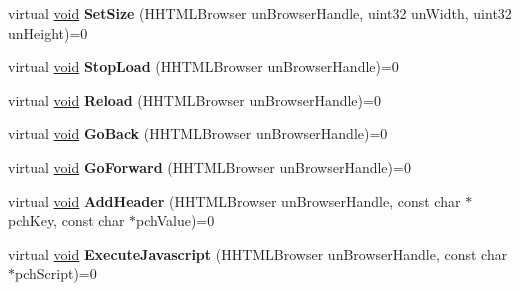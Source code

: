 \begin{DoxyCompactItemize}
\item 
\hypertarget{classISteamHTMLSurface_a740f1a05a2774324954a5b31f204cdca}{}virtual \hyperlink{SDL__audio_8h_a52835ae37c4bb905b903cbaf5d04b05f}{void} {\bfseries Set\+Size} (H\+H\+T\+M\+L\+Browser un\+Browser\+Handle, uint32 un\+Width, uint32 un\+Height)=0\label{classISteamHTMLSurface_a740f1a05a2774324954a5b31f204cdca}

\item 
\hypertarget{classISteamHTMLSurface_a1753fec92347e999535eb1dc595a41f5}{}virtual \hyperlink{SDL__audio_8h_a52835ae37c4bb905b903cbaf5d04b05f}{void} {\bfseries Stop\+Load} (H\+H\+T\+M\+L\+Browser un\+Browser\+Handle)=0\label{classISteamHTMLSurface_a1753fec92347e999535eb1dc595a41f5}

\item 
\hypertarget{classISteamHTMLSurface_a38f7f6daf4023170f6cffd1d651db32c}{}virtual \hyperlink{SDL__audio_8h_a52835ae37c4bb905b903cbaf5d04b05f}{void} {\bfseries Reload} (H\+H\+T\+M\+L\+Browser un\+Browser\+Handle)=0\label{classISteamHTMLSurface_a38f7f6daf4023170f6cffd1d651db32c}

\item 
\hypertarget{classISteamHTMLSurface_a70870c78a35e0916c1b9dd1240d15996}{}virtual \hyperlink{SDL__audio_8h_a52835ae37c4bb905b903cbaf5d04b05f}{void} {\bfseries Go\+Back} (H\+H\+T\+M\+L\+Browser un\+Browser\+Handle)=0\label{classISteamHTMLSurface_a70870c78a35e0916c1b9dd1240d15996}

\item 
\hypertarget{classISteamHTMLSurface_aac6ff06787667a32fceb04985d6c486c}{}virtual \hyperlink{SDL__audio_8h_a52835ae37c4bb905b903cbaf5d04b05f}{void} {\bfseries Go\+Forward} (H\+H\+T\+M\+L\+Browser un\+Browser\+Handle)=0\label{classISteamHTMLSurface_aac6ff06787667a32fceb04985d6c486c}

\item 
\hypertarget{classISteamHTMLSurface_aef7bc3d2ce1fd82c02f6a89e78266095}{}virtual \hyperlink{SDL__audio_8h_a52835ae37c4bb905b903cbaf5d04b05f}{void} {\bfseries Add\+Header} (H\+H\+T\+M\+L\+Browser un\+Browser\+Handle, const char $\ast$pch\+Key, const char $\ast$pch\+Value)=0\label{classISteamHTMLSurface_aef7bc3d2ce1fd82c02f6a89e78266095}

\item 
\hypertarget{classISteamHTMLSurface_a6bdc98a34ff569232f6668dadb0648a6}{}virtual \hyperlink{SDL__audio_8h_a52835ae37c4bb905b903cbaf5d04b05f}{void} {\bfseries Execute\+Javascript} (H\+H\+T\+M\+L\+Browser un\+Browser\+Handle, const char $\ast$pch\+Script)=0\label{classISteamHTMLSurface_a6bdc98a34ff569232f6668dadb0648a6}


\end{DoxyCompactItemize}
